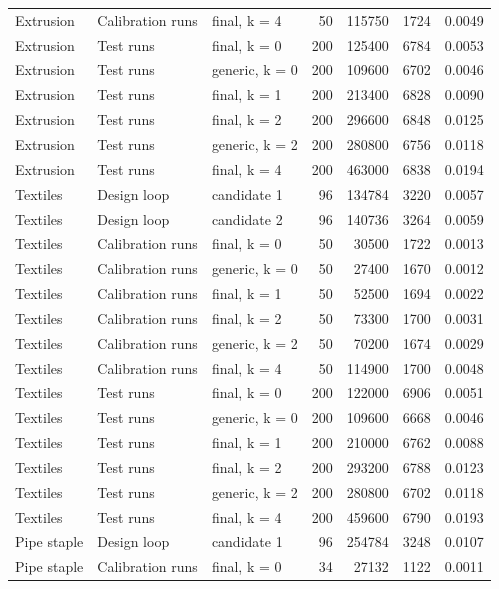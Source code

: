 \begin{table}
\begin{tabular}[t]{lllrrrr}
Extrusion & Calibration runs & final, k = 4 & 50 & 115750 & 1724 & 0.0049\\
\addlinespace
Extrusion & Test runs & final, k = 0 & 200 & 125400 & 6784 & 0.0053\\
Extrusion & Test runs & generic, k = 0 & 200 & 109600 & 6702 & 0.0046\\
Extrusion & Test runs & final, k = 1 & 200 & 213400 & 6828 & 0.0090\\
Extrusion & Test runs & final, k = 2 & 200 & 296600 & 6848 & 0.0125\\
Extrusion & Test runs & generic, k = 2 & 200 & 280800 & 6756 & 0.0118\\
\addlinespace
Extrusion & Test runs & final, k = 4 & 200 & 463000 & 6838 & 0.0194\\
Textiles & Design loop & candidate 1 & 96 & 134784 & 3220 & 0.0057\\
Textiles & Design loop & candidate 2 & 96 & 140736 & 3264 & 0.0059\\
Textiles & Calibration runs & final, k = 0 & 50 & 30500 & 1722 & 0.0013\\
Textiles & Calibration runs & generic, k = 0 & 50 & 27400 & 1670 & 0.0012\\
\addlinespace
Textiles & Calibration runs & final, k = 1 & 50 & 52500 & 1694 & 0.0022\\
Textiles & Calibration runs & final, k = 2 & 50 & 73300 & 1700 & 0.0031\\
Textiles & Calibration runs & generic, k = 2 & 50 & 70200 & 1674 & 0.0029\\
Textiles & Calibration runs & final, k = 4 & 50 & 114900 & 1700 & 0.0048\\
Textiles & Test runs & final, k = 0 & 200 & 122000 & 6906 & 0.0051\\
\addlinespace
Textiles & Test runs & generic, k = 0 & 200 & 109600 & 6668 & 0.0046\\
Textiles & Test runs & final, k = 1 & 200 & 210000 & 6762 & 0.0088\\
Textiles & Test runs & final, k = 2 & 200 & 293200 & 6788 & 0.0123\\
Textiles & Test runs & generic, k = 2 & 200 & 280800 & 6702 & 0.0118\\
Textiles & Test runs & final, k = 4 & 200 & 459600 & 6790 & 0.0193\\
\addlinespace
Pipe staple & Design loop & candidate 1 & 96 & 254784 & 3248 & 0.0107\\
Pipe staple & Calibration runs & final, k = 0 & 34 & 27132 & 1122 & 0.0011\\

\end{tabular}
\end{table}
